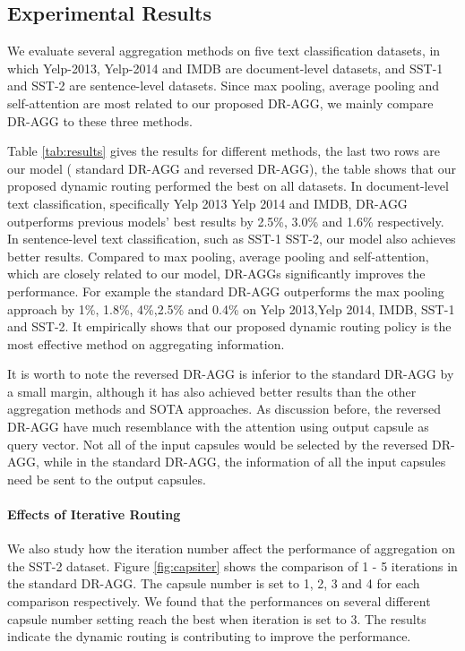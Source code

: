 \documentclass[11pt]{article}
\begin{document}
\subsection{Experimental Results}
We evaluate several aggregation methods  on five text classification datasets, in which Yelp-2013, Yelp-2014 and IMDB are document-level datasets, and SST-1 and SST-2 are sentence-level datasets. Since max pooling, average pooling and self-attention are most related to our proposed DR-AGG, we mainly compare DR-AGG to these three methods. 

Table \ref{tab:results} gives the results for different methods, the last two rows are our model ( standard DR-AGG  and reversed DR-AGG), the table shows that our proposed dynamic routing performed the best on all datasets. 
In document-level text classification, specifically Yelp 2013 Yelp 2014 and IMDB, DR-AGG outperforms previous models’ best results by 2.5\%, 3.0\% and 1.6\% respectively. In sentence-level text classification, such as SST-1 SST-2, our model also achieves better results. 
Compared to max pooling, average pooling and self-attention, which are closely related to our model, DR-AGGs significantly improves the performance. For example the standard DR-AGG outperforms the max pooling approach by 1\%, 1.8\%, 4\%,2.5\% and 0.4\% on Yelp 2013,Yelp 2014, IMDB, SST-1 and SST-2. It empirically shows that our proposed dynamic routing policy is the most effective method on aggregating information. 

It is worth to note the reversed DR-AGG is inferior to the standard 
DR-AGG by a small margin, although it has also achieved better results than the other aggregation methods and SOTA approaches. 
As discussion before, the reversed DR-AGG have much resemblance with the  attention using output capsule as query vector. Not all of the input capsules would be selected by the reversed DR-AGG, while in the standard DR-AGG, the information of all the input capsules need be sent to the output capsules.

\paragraph{Effects of Iterative Routing} We also study how the iteration number affect the performance of aggregation on the SST-2 dataset.  Figure \ref{fig:capsiter} shows the comparison of 1 - 5 iterations in the standard DR-AGG. The capsule number is set to 1, 2, 3 and 4 for each comparison respectively. We found that  the performances on several different capsule number setting reach the best when iteration is set to 3. The results indicate the dynamic routing is contributing to improve the performance.
\end{document}
